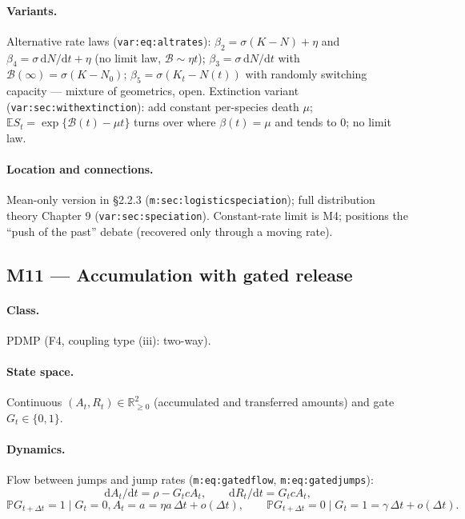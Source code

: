 \documentclass[11pt,a4paper]{article}
\newcommand{\PR}{\mathbb{P}}
\newcommand{\EX}{\mathbb{E}}
\newcommand{\dd}{\mathrm{d}}
\begin{document}
\paragraph{Variants.} Alternative rate laws (\texttt{var:eq:altrates}):
$\beta_2=\sigma(K-N)+\eta$ and $\beta_4=\sigma\,\dd N/\dd t+\eta$ (no limit
law, $\mathcal B\sim\eta t$); $\beta_3=\sigma\,\dd N/\dd t$ with
$\mathcal B(\infty)=\sigma(K-N_0)$; $\beta_5=\sigma(K_t-N(t))$ with randomly
switching capacity --- mixture of geometrics, open. Extinction variant
(\texttt{var:sec:withextinction}): add constant per-species death $\mu$;
$\EX{S_t}=\exp\{\mathcal B(t)-\mu t\}$ turns over where $\beta(t)=\mu$ and
tends to $0$; no limit law.

\paragraph{Location and connections.} Mean-only version in \S2.2.3
(\texttt{m:sec:logisticspeciation}); full distribution theory Chapter 9
(\texttt{var:sec:speciation}). Constant-rate limit is M4; positions the
``push of the past'' debate (recovered only through a moving rate).

\subsection{M11 --- Accumulation with gated release}

\paragraph{Class.} PDMP (F4, coupling type (iii): two-way).

\paragraph{State space.} Continuous $(A_t,R_t)\in\mathbb R_{\ge0}^2$
(accumulated and transferred amounts) and gate $G_t\in\{0,1\}$.

\paragraph{Dynamics.} Flow between jumps and jump rates
(\texttt{m:eq:gatedflow}, \texttt{m:eq:gatedjumps}):
\[
\dd A_t/\dd t=\rho-G_tcA_t,\qquad \dd R_t/\dd t=G_tcA_t,
\]
\[
\PR{G_{t+\Delta t}=1\mid G_t=0,A_t=a}=\eta a\,\Delta t+o(\Delta t),
\qquad
\PR{G_{t+\Delta t}=0\mid G_t=1}=\gamma\,\Delta t+o(\Delta t).
\]
\end{document}
